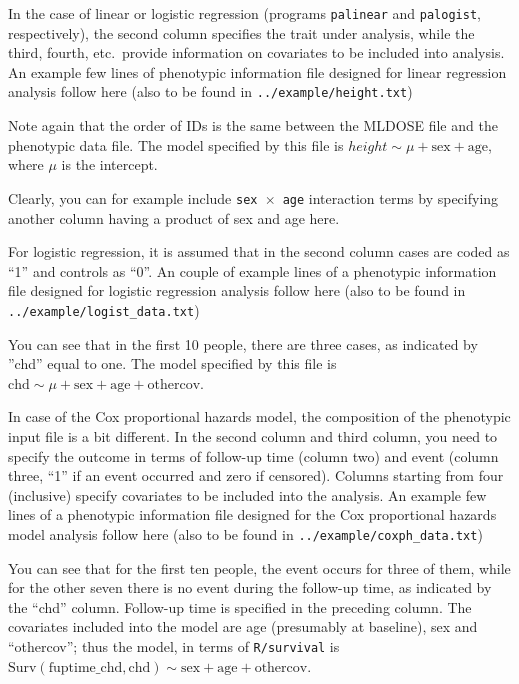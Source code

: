 \documentclass[12pt,a4paper]{article}
\begin{document}
In the case of linear or logistic regression (programs \texttt{palinear} and 
\texttt{palogist}, respectively), the second column specifies the trait 
under analysis, while the third, fourth, etc.~provide information on
covariates to be included into analysis.  
An example few lines of phenotypic information file designed for 
linear regression analysis follow here (also 
to be found in \texttt{../example/height.txt})



Note again that the order of IDs is the same between the MLDOSE file
and the phenotypic data file. The model specified by this file is
$height \sim \mu + \textrm{sex} + \textrm{age}$, where $\mu$ is the intercept.  

Clearly, you can for example include \texttt{sex $\times$ age} interaction terms by 
specifying another column having a product of sex and age here.

For logistic regression, it is assumed that in the second column cases are 
coded as ``1'' and controls as ``0''. An couple of example lines of a phenotypic 
information file designed for logistic regression analysis follow here (also 
to be found in \texttt{../example/logist\_data.txt})



You can see that in the first 10 people, there are three cases, as indicated 
by ''chd'' equal to one. The model specified by this file 
is $\textrm{chd} \sim \mu + \textrm{sex} + \textrm{age} + \textrm{othercov}$.  

In case of the Cox proportional hazards model, the composition of the 
phenotypic input file is a bit different. In the second column and 
third column, you need to specify the outcome in terms of follow-up 
time (column two) and event (column three, ``1'' if an event occurred 
and zero if censored). Columns starting from four (inclusive) specify
covariates to be included into the analysis. An example few lines of
a phenotypic information file designed for the Cox proportional hazards model 
analysis follow here (also to be found in
\texttt{../example/coxph\_data.txt})



You can see that for the first ten people, the event occurs for three of 
them, while for the other seven there is no event during the follow-up 
time, as indicated by the ``chd'' column. Follow-up time is specified in the preceding 
column. The covariates included into the model are age (presumably 
at baseline), sex and ``othercov''; thus the model, in terms of 
\texttt{R/survival} is \\ $\textrm{Surv}(\textrm{fuptime\_chd},
\textrm{chd}) \sim \textrm{sex} + \textrm{age} + \textrm{othercov}$.
\end{document}

